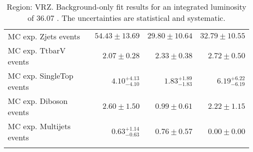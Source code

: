 \begin{table}
\begin{center}
{\begin{tabular*}{\textwidth}{@{\extracolsep{\fill}}lrrr}
        MC exp. Zjets events         & $54.43 \pm 13.69$          & $29.80 \pm 10.64$          & $32.79 \pm 10.55$              \\
        MC exp. TtbarV events         & $2.07 \pm 0.28$          & $2.33 \pm 0.38$          & $2.72 \pm 0.50$              \\
        MC exp. SingleTop events         & $4.10_{-4.10}^{+4.13}$          & $1.83_{-1.83}^{+1.89}$          & $6.19_{-6.19}^{+6.22}$              \\
        MC exp. Diboson events         & $2.60 \pm 1.50$          & $0.99 \pm 0.61$          & $2.22 \pm 1.15$              \\
        MC exp. Multijets events         & $0.63_{-0.63}^{+1.14}$          & $0.76 \pm 0.57$          & $0.00 \pm 0.00$              \\
\noalign{\smallskip}\hline\noalign{\smallskip}
\end{tabular*}
}
\end{center}
\caption{Region: VRZ. Background-only fit results for an integrated luminosity of 36.07 \ifb. The uncertainties are statistical and systematic.
}
\label{table.bkgonly.VRZ}
\end{table}
%